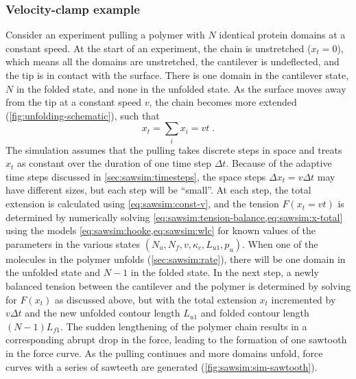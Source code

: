 \subsubsection{Velocity-clamp example}
\label{sec:sawsim:velocity-clamp}

Consider an experiment pulling a polymer with $N$ identical protein
domains at a constant speed.  At the start of an experiment, the
chain is unstretched ($x_t=0$), which means all the domains are
unstretched, the cantilever is undeflected, and the tip is in contact
with the surface.  There is one domain in the cantilever state, $N$ in
the folded state, and none in the unfolded state.  As the surface
moves away from the tip at a constant speed $v$, the chain becomes
more extended (\cref{fig:unfolding-schematic}), such that
\begin{equation}
  x_t = \sum_i x_i = vt  \label{eq:sawsim:const-v} \;.
\end{equation}
The simulation assumes that the pulling takes discrete steps in space
and treats $x_t$ as constant over the duration of one time step
$\Delta t$.  Because of the adaptive time steps discussed in
\cref{sec:sawsim:timesteps}, the space steps $\Delta x_t = v\Delta t$
may have different sizes, but each step will be ``small''.  At each
step, the total extension is calculated using
\cref{eq:sawsim:const-v}, and the tension $F(x_t=vt)$ is determined by
numerically solving \cref{eq:sawsim:tension-balance,eq:sawsim:x-total}
using the models \cref{eq:sawsim:hooke,eq:sawsim:wlc}
for known values of the parameters in the various states $(N_u, N_f,
v, \kappa_c,
L_{u1}, p_u)$.  When one of the molecules in the
polymer unfolds (\cref{sec:sawsim:rate}), there will be
one domain in the unfolded state and $N-1$ in the folded state.  In
the next step, a newly balanced tension between the cantilever and the
polymer is determined by solving for $F(x_t)$ as discussed above, but
with the total extension $x_t$ incremented by $v\Delta t$ and the new
unfolded contour length $L_{u1}$ and folded contour length
$(N-1)L_{f1}$.  The sudden lengthening of the polymer chain results in
a corresponding abrupt drop in the force, leading to the formation of
one sawtooth in the force curve.  As the pulling continues and more
domains unfold, force curves with a series of sawteeth are generated
(\cref{fig:sawsim:sim-sawtooth}).
%


